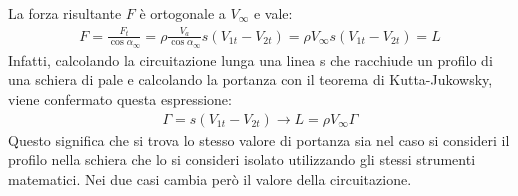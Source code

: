 La forza risultante $F$ è ortogonale a $V_\infty$ e vale:
\begin{align*}
F=\frac{F_t}{\cos \alpha_{\infty}}=\rho \frac{V_a}{\cos \alpha_{\infty}}s(V_{1t}-V_{2t})=\rho V_\infty s (V_{1t}-V_{2t})=L
\end{align*}
Infatti, calcolando la circuitazione lunga una linea s che racchiude un profilo di una schiera di pale e calcolando la portanza con il teorema di Kutta-Jukowsky, viene confermato questa espressione:
\begin{align*}
\Gamma=s(V_{1t}-V_{2t}) \rightarrow L=\rho V_\infty \Gamma
\end{align*}
Questo significa che si trova lo stesso valore di portanza sia nel caso si consideri il profilo nella schiera che lo si consideri isolato utilizzando gli stessi strumenti matematici. Nei due casi cambia però il valore della circuitazione.

